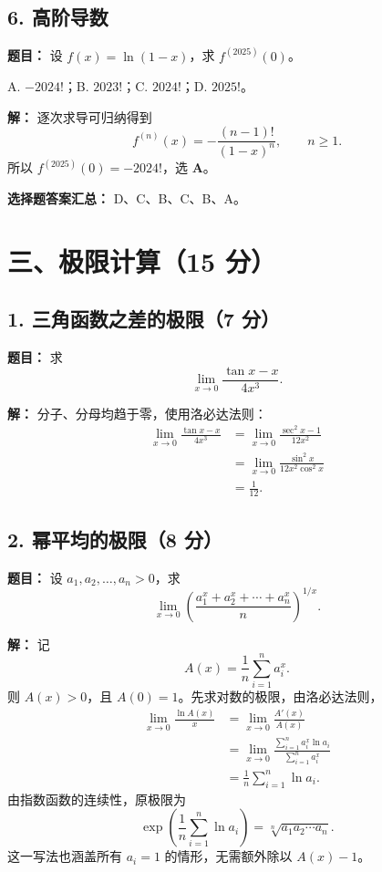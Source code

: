 \documentclass[UTF8,a4paper,11pt,fontset=fandol]{ctexart}
\begin{document}
\subsection*{6. 高阶导数}

\textbf{题目：} 设 $f(x)=\ln(1-x)$，求 $f^{(2025)}(0)$。

A. $-2024!$；B. $2023!$；C. $2024!$；D. $2025!$。

\textbf{解：} 逐次求导可归纳得到
\[
f^{(n)}(x)=-\frac{(n-1)!}{(1-x)^n},\qquad n\ge1.
\]
所以 $f^{(2025)}(0)=-2024!$，选 \textbf{A}。

\textbf{选择题答案汇总：} D、C、B、C、B、A。

\section*{三、极限计算（15 分）}

\subsection*{1. 三角函数之差的极限（7 分）}

\textbf{题目：} 求
\[
\lim_{x\to0}\frac{\tan x-x}{4x^3}.
\]

\textbf{解：} 分子、分母均趋于零，使用洛必达法则：
\[
\begin{aligned}
\lim_{x\to0}\frac{\tan x-x}{4x^3}
&=\lim_{x\to0}\frac{\sec^2x-1}{12x^2}\\
&=\lim_{x\to0}\frac{\sin^2x}{12x^2\cos^2x}\\
&=\boxed{\frac1{12}}.
\end{aligned}
\]

\subsection*{2. 幂平均的极限（8 分）}

\textbf{题目：} 设 $a_1,a_2,\ldots,a_n>0$，求
\[
\lim_{x\to0}\left(\frac{a_1^x+a_2^x+\cdots+a_n^x}{n}\right)^{1/x}.
\]

\textbf{解：} 记
\[
A(x)=\frac1n\sum_{i=1}^n a_i^x.
\]
则 $A(x)>0$，且 $A(0)=1$。先求对数的极限，由洛必达法则，
\[
\begin{aligned}
\lim_{x\to0}\frac{\ln A(x)}x
&=\lim_{x\to0}\frac{A'(x)}{A(x)}\\
&=\lim_{x\to0}\frac{\sum_{i=1}^n a_i^x\ln a_i}{\sum_{i=1}^n a_i^x}\\
&=\frac1n\sum_{i=1}^n\ln a_i.
\end{aligned}
\]
由指数函数的连续性，原极限为
\[
\boxed{\exp\left(\frac1n\sum_{i=1}^n\ln a_i\right)
=\sqrt[n]{a_1a_2\cdots a_n}}.
\]
这一写法也涵盖所有 $a_i=1$ 的情形，无需额外除以 $A(x)-1$。
\end{document}
